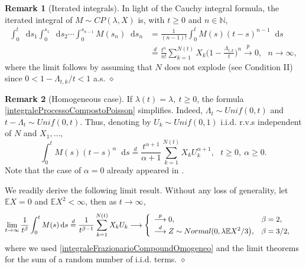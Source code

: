\documentclass[12pt, twoside, english, headsepline]{article}
\newcommand*\dif{\mathop{}\!\mathrm{d}}  %
\theoremstyle{definition} %
\newtheorem{remark}{Remark}[section] %
\numberwithin{equation}{section} %
\begin{document}
\begin{remark}[Iterated integrals]
	In light of the Cauchy integral formula, the iterated integral of $M\sim CP(\lambda, X)$ is, with $t\ge0$ and $n\in\mathbb{N}$,
	\begin{align*}
		\int_0^t\dif s_1\int_0^{s_1} \dif s_2\cdots \int_0^{s_{n-1}}M(s_n)\dif s_n &= \frac{1}{(n-1)!}\int_0^t M(s)(t-s)^{n-1} \dif s \nonumber\\
		& \stackrel{d}{=} \frac{t^n}{n!} \sum_{k=1}^{N(t)} X_k \Big(1-\frac{\Lambda_{t,k}}{t}\Big)^{n} \stackrel{p}{\longrightarrow}0, \ \ \ n\rightarrow\infty,
	\end{align*}
	where the limit follows by assuming that $N$ does not explode (see Condition II) since $0<1-\Lambda_{t,k}/t<1$ a.s. \hfill $\diamond$
\end{remark}

\begin{remark}[Homogeneous case]\label{remarkIntegraleCompoundOmogeneo}
	If $\lambda(t) = \lambda ,\ t\ge0$, the formula \eqref{integraleProcessoCompostoPoisson} simplifies. Indeed, $\Lambda_t \sim Unif(0,t)$ and $t-\Lambda_t \sim Unif(0,t)$. Thus, denoting by $U_k\sim Unif(0,1)$ i.i.d. r.v.s independent of $N$ and $X_1,\dots$,
	\begin{equation}\label{integraleFrazionarioCompoundOmogeneo}
		\int_0^t M(s)(t-s)^\alpha \dif s \stackrel{d}{=} \frac{t^{\alpha+1}}{\alpha+1} \sum_{k=1}^{N(t)} X_k U_k^{\alpha+1},\ \ \ t\ge0,\ \alpha\ge0.
	\end{equation}
	Note that the case of $\alpha = 0$ already appeared in \cite{CO202}.
	
	We readily derive the following limit result. Without any loss of generality, let $\mathbb{E}X =0$ and $\mathbb{E}X^2 <\infty$, then as $t\longrightarrow \infty$,
	\begin{align*}
		\lim_{t\rightarrow\infty} \frac{1}{t^{\beta}} \int_0^t M(s) \dif s \stackrel{d}{=} \frac{1}{t^{\beta-1}} \sum_{k=1}^{N(t)} X_k U_k 	
		 \longrightarrow \begin{cases}
			\begin{array}{l l}
				\displaystyle \stackrel{p}{\longrightarrow} 0, & \beta = 2,\\
				\displaystyle \stackrel{d}{\longrightarrow} Z\sim Normal(0, \lambda \mathbb{E}X^2 / 3\big), & \beta = 3/2,
			\end{array}
		\end{cases}
	\end{align*}
	where we used \eqref{integraleFrazionarioCompoundOmogeneo} and the limit theorems for the sum of a random number of i.i.d. terms. \hfill$\diamond$
\end{remark}
\end{document}
